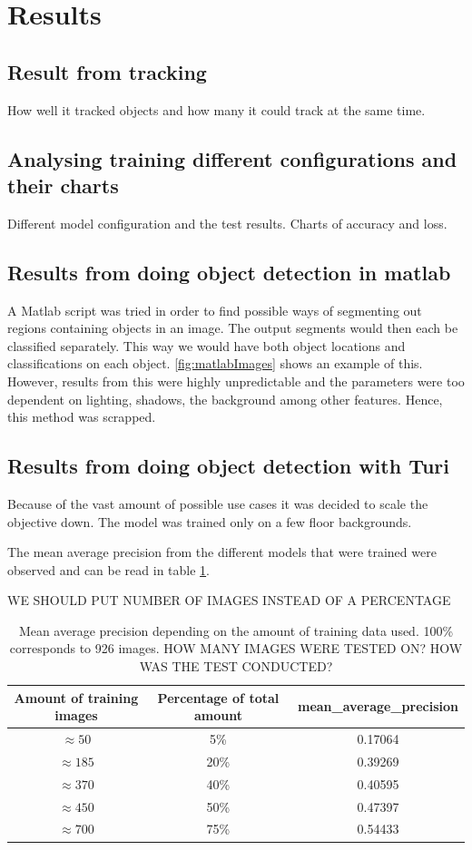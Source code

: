 \section{Results}
\subsection{Result from tracking}

How well it tracked objects and how many it could track at the same time.

\subsection{Analysing training different configurations and their charts}

Different model configuration and the test results. Charts of accuracy and loss.

\subsection{Results from doing object detection in matlab}
A Matlab script was tried in order to find possible ways of segmenting out regions containing objects in an image. The output segments would then each be classified separately. This way we would have both object locations and classifications on each object. \ref{fig:matlabImages} shows an example of this. However, results from this were highly unpredictable and the parameters were too dependent on lighting, shadows, the background among other features. Hence, this method was scrapped.

\subsection{Results from doing object detection with Turi}
Because of the vast amount of possible use cases it was decided to scale the objective down. The model was trained only on a few floor backgrounds. 

The mean average precision from the different models that were trained were observed and can be read in table \ref{table:mAP}. 

WE SHOULD PUT NUMBER OF IMAGES INSTEAD OF A PERCENTAGE

\begin{table}[h]
\centering
\begin{tabular}{ |c|c|c| } 
 \hline
 Amount of training images & Percentage of total amount & mean\_average\_precision  \\ 
 \hline
 $\approx 50$& 5\% & 0.17064 \\
 \hline
 $\approx 185$& 20\% & 0.39269 \\
 \hline
 $\approx 370$& 40\% & 0.40595 \\
 \hline
 $\approx 450$& 50\% & 0.47397 \\
 \hline
 $\approx 700$& 75\% & 0.54433 \\
 \hline
\end{tabular}
\caption{Mean average precision depending on the amount of training data used. 100\% corresponds to 926 images. HOW MANY IMAGES WERE TESTED ON? HOW WAS THE TEST CONDUCTED?}
\label{table:mAP}
\end{table}

